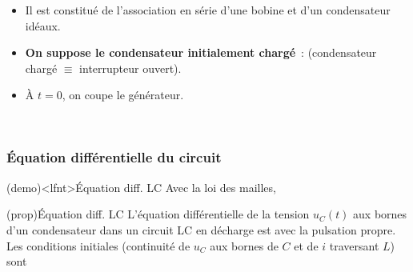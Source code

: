 \documentclass[../../main/main.tex]{subfiles}
\begin{document}
\begin{minipage}[c]{.6\linewidth}
	\begin{itemize}
		\item Il est constitué de l'association en série d'une bobine et d'un
		      condensateur idéaux.
		\item \textbf{On suppose le condensateur initialement chargé}~:
		       (condensateur chargé
		      $\equiv$ interrupteur ouvert).
		\item À $t=0$, on coupe le générateur.
	\end{itemize}
\end{minipage}
\hfill
\begin{minipage}[c]{.35\linewidth}
	~
	\begin{center}
	\end{center}
\end{minipage}

\subsubsection{Équation différentielle du circuit}
\begin{tcb}[label=demo:eqdiffrc](demo)<lfnt>{Équation diff. LC}
	Avec la loi des mailles,
\end{tcb}
\begin{tcb}[label=prop:eqdiffrc, sidebyside, righthand ratio=.4](prop){Équation diff. LC}
	L'équation différentielle de la tension $u_C(t)$ aux bornes d'un
	condensateur dans un circuit LC en décharge est
	\psw{
		\[
			\boxed{\dv[2]{u_C}{t} + \w_0{}^2u_C = 0}
		\]
	}
	avec  la pulsation propre.
	\tcblower
	Les conditions initiales (continuité de $u_C$ aux bornes de $C$
	et de $i$ traversant $L$) sont
\end{tcb}
\end{document}
